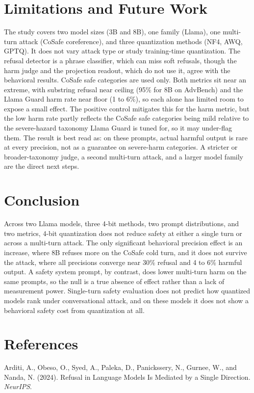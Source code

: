 \documentclass[11pt]{article}
\begin{document}
\section{Limitations and Future Work}
The study covers two model sizes (3B and 8B), one family (Llama), one multi-turn
attack (CoSafe coreference), and three quantization methods (NF4, AWQ, GPTQ). It
does not vary attack type or study training-time quantization. The refusal
detector is a phrase classifier, which can miss soft refusals, though the harm
judge and the projection readout, which do not use it, agree with the behavioral
results. CoSafe safe categories are used only. Both metrics sit near an extreme,
with substring refusal near ceiling (95\% for 8B on AdvBench) and the Llama Guard
harm rate near floor (1 to 6\%), so each alone has limited room to expose a small
effect. The positive control mitigates this for the harm metric, but the low harm
rate partly reflects the CoSafe safe categories being mild relative to the
severe-hazard taxonomy Llama Guard is tuned for, so it may under-flag them. The
result is best read as: on these prompts, actual harmful output is rare at every
precision, not as a guarantee on severe-harm categories. A stricter or
broader-taxonomy judge, a second multi-turn attack, and a larger model family are
the direct next steps.

\section{Conclusion}
Across two Llama models, three 4-bit methods, two prompt distributions, and two
metrics, 4-bit quantization does not reduce safety at either a single turn or
across a multi-turn attack. The only significant behavioral precision effect is an
increase, where 8B refuses more on the CoSafe cold turn, and it does not survive
the attack, where all precisions converge near 30\% refusal and 4 to 6\% harmful
output. A safety system prompt, by contrast, does lower multi-turn harm on the
same prompts, so the null is a true absence of effect rather than a lack of
measurement power. Single-turn safety evaluation does not predict how quantized
models rank under conversational attack, and on these models it does not show a
behavioral safety cost from quantization at all.

\section*{References}
\small
Arditi, A., Obeso, O., Syed, A., Paleka, D., Panickssery, N., Gurnee, W., and
Nanda, N. (2024). Refusal in Language Models Is Mediated by a Single Direction.
\textit{NeurIPS}.
\end{document}
